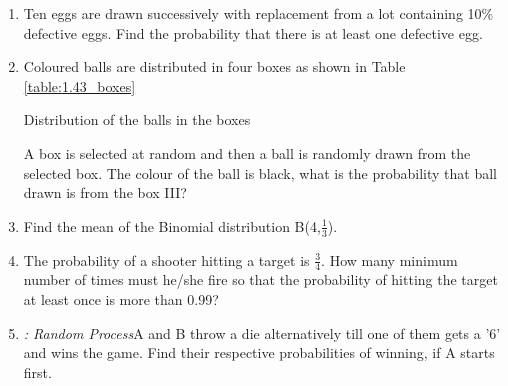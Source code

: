 \begin{enumerate}[label=\arabic*.,ref=\thesubsection.\theenumi]
\item Ten eggs are drawn successively with replacement from a lot containing 10$\%$ defective eggs. Find the probability that there is at least one defective egg.\\
\solution


\item Coloured balls are distributed in four boxes as shown in Table \ref{table:1.43_boxes}

\begin{table}[ht!]
\centering

\caption{Distribution of the balls in the boxes}
\label{table:1.43_boxes}
\end{table}
A box is selected at random and then a ball is randomly drawn from the selected box. The colour of the ball is black, what is the probability that ball drawn is from the box III?
\\
\solution


\item Find the mean of the Binomial distribution B(4,$\frac{1}{3}$).
\\
\solution


\item The probability of a shooter hitting a target is $\frac{3}{4}$. How many minimum
number of times must he/she fire so that the probability of hitting the target at least
once is more than 0.99?
\\
\solution


\item {\em: Random Process}A and B throw a die alternatively till one of them gets a '6' and wins the game. Find their respective probabilities of winning, if A starts first.
\\
\solution



\end{enumerate}
